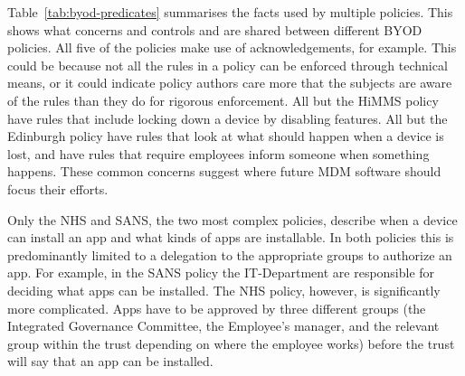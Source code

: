 \documentclass{llncs}
\newenvironment{policyrule}[1]{%
  \begin{mdframed}\footnotesize
      \noindent\textbf{\sffamily #1}:~\itshape%
}{%
  \end{mdframed}
}
\begin{document}
Table~\ref{tab:byod-predicates} summarises the facts used by multiple policies.
This shows what concerns and controls and are shared between different BYOD policies.
All five of the policies make use of acknowledgements, for example.
This could be because not all the rules in a policy can be enforced through technical means, 
  or it could indicate policy authors care more that the subjects are aware of the rules than they do for rigorous enforcement.
All but the HiMMS policy have rules that include locking down a device by disabling features.
All but the Edinburgh policy have rules that look at what should happen when a device is lost,
  and have rules that require employees inform someone when something happens.
These common concerns suggest where future \ac{MDM} software should focus their efforts.

Only the NHS and SANS, the two most complex policies, describe when a device can install an app and what kinds of apps are installable.
In both policies this is predominantly limited to a delegation to the appropriate groups to authorize an app.
For example, in the SANS policy the IT-Department are responsible for deciding what apps can be installed.
The NHS policy, however, is significantly more complicated.
Apps have to be approved by three different groups (the Integrated Governance Committee, the Employee's manager, and the relevant group within the trust depending on where the employee works) before the trust will say that an app can be installed.
\end{document}
